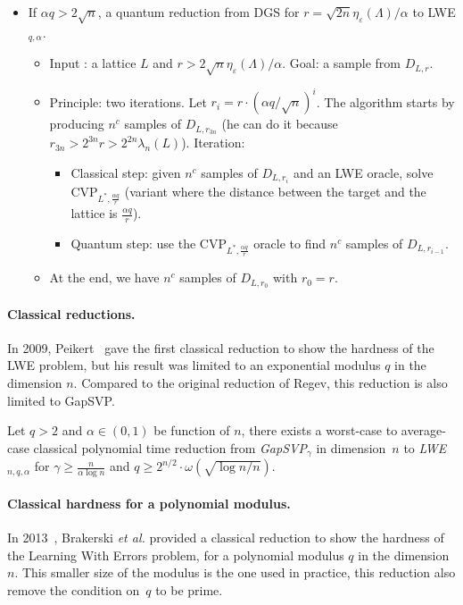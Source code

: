 \begin{itemize}
\item If $\alpha q > 2 \sqrt{n}$, a quantum reduction from DGS for $r= \sqrt{2n} \eta_{\varepsilon}(\Lambda) / \alpha$ to LWE$_{q,\alpha}$.
\begin{itemize}
\item Input : a lattice $L$ and $r > 2 \sqrt{n} \eta_{\varepsilon}(\Lambda) / \alpha$. Goal: a sample from $D_{L,r}$.
\item Principle: two iterations. Let $r_i = r \cdot (\alpha q / \sqrt{n})^i$. The algorithm starts by producing $n^c$ samples of $D_{L,r_{3n}} $ (he can do it because $r_{3n} > 2^{3n}r > 2^{2n} \lambda_n(L)$). Iteration:
\begin{itemize}
\item Classical step: given $n^c$ samples of $D_{L,r_i}$ and an LWE oracle, solve CVP$_{L^*,\frac{\alpha q}{r}}$ (variant where the distance between the target and the lattice is $\frac{\alpha q}{r}$). 
\item Quantum step: use the CVP$_{L^*,\frac{\alpha q}{r}}$ oracle to find $n^c$ samples of $D_{L,r_{i-1}}$.
\end{itemize}
\item At the end, we have $n^c$ samples of $D_{L,r_0}$ with $r_0=r$.
\end{itemize}
\end{itemize}


\paragraph{Classical reductions.} In 2009, Peikert~\cite{Pei09} gave the first classical reduction to show the hardness of the LWE problem, but his result was limited to an exponential modulus $q$ in the dimension $n$. Compared to the original reduction of Regev, this reduction is also limited to GapSVP.

\begin{theorem}
Let $q >2$ and $\alpha \in (0,1)$ be function of $n$, there exists a worst-case to average-case classical polynomial time reduction from \emph{GapSVP}$_{\gamma}$ in dimension~$n$ to \emph{LWE}$_{n,q,\alpha}$ for $\gamma \geq \frac{n}{\alpha \log n}$ and $q \geq 2^{n/2} \cdot \omega(\sqrt{\log n /n})$. 
\end{theorem}

\paragraph{Classical hardness for a polynomial modulus.} In 2013~\cite{BLPRS13}, Brakerski \emph{et al.} provided a classical reduction to show the hardness of the Learning With Errors problem, for a polynomial modulus $q$ in the dimension $n$. This smaller size of the modulus is the one used in practice, this reduction also remove the condition on~$q$ to be prime.

